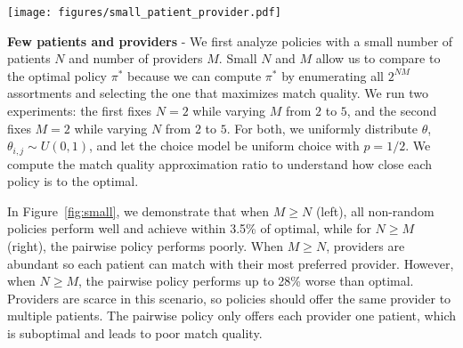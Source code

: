 \begin{example}
\label{ex:small}
\begin{figure*}
    \centering 
    \texttt{[image: figures/small\_patient\_provider.pdf]}
    \caption{We find the optimal policy and compute the approximation ratio for match quality compared to optimal. While all non-random policies achieve approximation ratios $\geq 0.9$ when $M \geq N$ (left), the pairwise policy performs poorly and achieves a low approximation ratio when $N \geq M$ (right).} 
    \label{fig:small}
\end{figure*}
\textbf{Few patients and providers} - We first analyze policies with a small number of patients $N$ and number of providers $M$. 
Small $N$ and $M$ allow us to compare to the optimal policy $\pi^{*}$ because we can compute $\pi^{*}$ by enumerating all $2^{NM}$ assortments and selecting the one that maximizes match quality. 
We run two experiments: the first fixes $N=2$ while varying $M$ from $2$ to $5$, and the second fixes $M=2$ while varying $N$ from $2$ to $5$. 
For both, we uniformly distribute $\theta$, $\theta_{i,j} \sim U(0,1)$, and let the choice model be uniform choice with $p=1/2$.
We compute the match quality approximation ratio to understand how close each policy is to the optimal. 

In Figure~\ref{fig:small}, we demonstrate that when $M \geq N$ (left), all non-random policies perform well and achieve within 3.5\% of optimal, while for $N \geq M$ (right), the pairwise policy performs poorly. 
When $M \geq N$, providers are abundant so each patient can match with their most preferred provider. 
However, when $N \geq M$, the pairwise policy performs up to 28\% worse than optimal. Providers are scarce in this scenario, so policies should offer the same provider to multiple patients. 
The pairwise policy only offers each provider one patient, which is suboptimal and leads to poor match quality.
\end{example}


